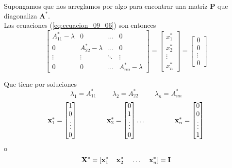 \begin{frame}
Supongamos que nos arreglamos por algo para encontrar una matriz $\mathbf{P}$ que diagonaliza $\mathbf{A}^{*}$.
\\
\bigskip
Las ecuaciones (\ref{eq:ecuacion_09_06}) son entonces
\[  \begin{bmatrix}
A_{11}^{*} - \lambda & 0          & \ldots & 0 \\
0          & A_{22}^{*} - \lambda & \ldots & 0 \\
\vdots 	   & \vdots & \ddots & \vdots \\
0 & 0 & \ldots & A_{nn}^{*} - \lambda
\end{bmatrix} = 
\begin{bmatrix}
x_{1}^{*} \\
x_{2}^{*} \\
\vdots \\
x_{n}^{*} 
\end{bmatrix} = 
\begin{bmatrix}
0 \\
0 \\
\vdots \\
0
\end{bmatrix}\]
\end{frame}
\begin{frame}
Que tiene por soluciones
\begin{equation}
\lambda_{1} =  A_{11}^{*} \hspace{1cm} \lambda_{2} =  A_{22}^{*} \hspace{1cm} \lambda_{n} =  A_{nn}^{*}
\label{eq:ecuacion_09_07}
\end{equation}
\[ \mathbf{x}_{1}^{*} = \begin{bmatrix}
1 \\
0 \\
\vdots \\
0
\end{bmatrix} \hspace{1.5cm}
\mathbf{x}_{2}^{*} = \begin{bmatrix}
0 \\
1 \\
\vdots \\
0
\end{bmatrix} \ldots \hspace{1.5cm}
\mathbf{x}_{n}^{*} = \begin{bmatrix}
0 \\
0 \\
\vdots \\
1
\end{bmatrix} \]
\pause
o
\[ \mathbf{X^{*}} = \left[ \mathbf{x}_{1}^{*} \hspace{0.4cm} \mathbf{x}_{2}^{*} \hspace{0.4cm} \ldots \hspace{0.4cm} \mathbf{x}_{n}^{*} \right] = \mathbf{I} \]
\end{frame}

